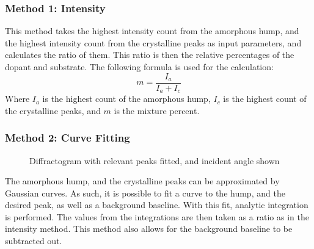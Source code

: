     \subsubsection*{Method 1: Intensity}

        This method takes the highest intensity count from the amorphous hump, and the highest intensity count from the crystalline peaks as input parameters, and calculates the ratio of them.
        This ratio is then the relative percentages of the dopant and substrate\cite{pandey_structural_2021}.
        The following formula is used for the calculation:
        \begin{equation}
            m=\frac{I_a}{I_a+I_c}  
            \label{eq: mixture equation}
        \end{equation}
        Where $I_a$ is the highest count of the amorphous hump, $I_c$ is the highest count of the crystalline peaks, and $m$ is the mixture percent.


    \subsubsection*{Method 2: Curve Fitting}

        \begin{figure}[H]
            \centering
            
            \caption{Diffractogram with relevant peaks fitted, and incident angle shown}
            \label{fig: fitted peaks}
        \end{figure}

        The amorphous hump, and the crystalline peaks can be approximated by Gaussian curves.
        As such, it is possible to fit a curve to the hump, and the desired peak, as well as a background baseline. 
        With this fit, analytic integration is performed.
        The values from the integrations are then taken as a ratio as in the intensity method.
        This method also allows for the background baseline to be subtracted out.


